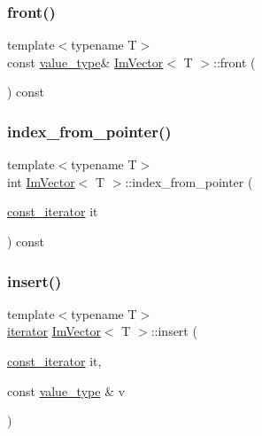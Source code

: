 \subsubsection{\texorpdfstring{front()}{front()}\hspace{0.1cm}{\footnotesize\ttfamily [2/2]}}
{\footnotesize\ttfamily template$<$typename T$>$ \\
const \mbox{\hyperlink{class_im_vector_a8bd77e4e7581d8e5f9e98d7c2f3c2a80}{value\+\_\+type}}\& \mbox{\hyperlink{class_im_vector}{Im\+Vector}}$<$ T $>$\+::front (\begin{DoxyParamCaption}{ }\end{DoxyParamCaption}) const\hspace{0.3cm}{\ttfamily [inline]}}

\mbox{\label{class_im_vector_aab9b55d6496e7fc637a3c3e90f793504}} 
\subsubsection{\texorpdfstring{index\+\_\+from\+\_\+pointer()}{index\_from\_pointer()}}
{\footnotesize\ttfamily template$<$typename T$>$ \\
int \mbox{\hyperlink{class_im_vector}{Im\+Vector}}$<$ T $>$\+::index\+\_\+from\+\_\+pointer (\begin{DoxyParamCaption}\item[{\mbox{\hyperlink{class_im_vector_aedeac9c5080f9d6ce96ae837768ee4c4}{const\+\_\+iterator}}}]{it }\end{DoxyParamCaption}) const\hspace{0.3cm}{\ttfamily [inline]}}

\mbox{\label{class_im_vector_a52fdb731c13c82a1fd971186c6a701b5}} 
\subsubsection{\texorpdfstring{insert()}{insert()}}
{\footnotesize\ttfamily template$<$typename T$>$ \\
\mbox{\hyperlink{class_im_vector_a74b5478f1f6fd471cc71219bce483db6}{iterator}} \mbox{\hyperlink{class_im_vector}{Im\+Vector}}$<$ T $>$\+::insert (\begin{DoxyParamCaption}\item[{\mbox{\hyperlink{class_im_vector_aedeac9c5080f9d6ce96ae837768ee4c4}{const\+\_\+iterator}}}]{it,  }\item[{const \mbox{\hyperlink{class_im_vector_a8bd77e4e7581d8e5f9e98d7c2f3c2a80}{value\+\_\+type}} \&}]{v }\end{DoxyParamCaption})\hspace{0.3cm}{\ttfamily [inline]}}

